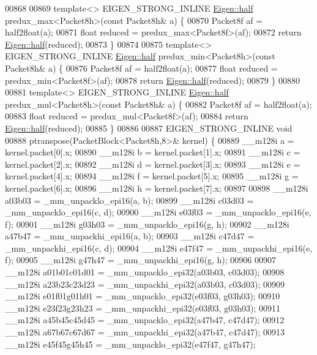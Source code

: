 \begin{DoxyCode}
00868 
00869 \textcolor{keyword}{template}<> EIGEN\_STRONG\_INLINE \hyperlink{struct_eigen_1_1half}{Eigen::half} predux\_max<Packet8h>(\textcolor{keyword}{const} Packet8h& a) \{
00870   Packet8f af = half2float(a);
00871   \textcolor{keywordtype}{float} reduced = predux\_max<Packet8f>(af);
00872   \textcolor{keywordflow}{return} \hyperlink{struct_eigen_1_1half}{Eigen::half}(reduced);
00873 \}
00874 
00875 \textcolor{keyword}{template}<> EIGEN\_STRONG\_INLINE \hyperlink{struct_eigen_1_1half}{Eigen::half} predux\_min<Packet8h>(\textcolor{keyword}{const} Packet8h& a) \{
00876   Packet8f af = half2float(a);
00877   \textcolor{keywordtype}{float} reduced = predux\_min<Packet8f>(af);
00878   \textcolor{keywordflow}{return} \hyperlink{struct_eigen_1_1half}{Eigen::half}(reduced);
00879 \}
00880 
00881 \textcolor{keyword}{template}<> EIGEN\_STRONG\_INLINE \hyperlink{struct_eigen_1_1half}{Eigen::half} predux\_mul<Packet8h>(\textcolor{keyword}{const} Packet8h& a) \{
00882   Packet8f af = half2float(a);
00883   \textcolor{keywordtype}{float} reduced = predux\_mul<Packet8f>(af);
00884   \textcolor{keywordflow}{return} \hyperlink{struct_eigen_1_1half}{Eigen::half}(reduced);
00885 \}
00886 
00887 EIGEN\_STRONG\_INLINE \textcolor{keywordtype}{void}
00888 ptranspose(PacketBlock<Packet8h,8>& kernel) \{
00889   \_\_m128i a = kernel.packet[0].x;
00890   \_\_m128i b = kernel.packet[1].x;
00891   \_\_m128i c = kernel.packet[2].x;
00892   \_\_m128i d = kernel.packet[3].x;
00893   \_\_m128i e = kernel.packet[4].x;
00894   \_\_m128i f = kernel.packet[5].x;
00895   \_\_m128i g = kernel.packet[6].x;
00896   \_\_m128i h = kernel.packet[7].x;
00897 
00898   \_\_m128i a03b03 = \_mm\_unpacklo\_epi16(a, b);
00899   \_\_m128i c03d03 = \_mm\_unpacklo\_epi16(c, d);
00900   \_\_m128i e03f03 = \_mm\_unpacklo\_epi16(e, f);
00901   \_\_m128i g03h03 = \_mm\_unpacklo\_epi16(g, h);
00902   \_\_m128i a47b47 = \_mm\_unpackhi\_epi16(a, b);
00903   \_\_m128i c47d47 = \_mm\_unpackhi\_epi16(c, d);
00904   \_\_m128i e47f47 = \_mm\_unpackhi\_epi16(e, f);
00905   \_\_m128i g47h47 = \_mm\_unpackhi\_epi16(g, h);
00906 
00907   \_\_m128i a01b01c01d01 = \_mm\_unpacklo\_epi32(a03b03, c03d03);
00908   \_\_m128i a23b23c23d23 = \_mm\_unpackhi\_epi32(a03b03, c03d03);
00909   \_\_m128i e01f01g01h01 = \_mm\_unpacklo\_epi32(e03f03, g03h03);
00910   \_\_m128i e23f23g23h23 = \_mm\_unpackhi\_epi32(e03f03, g03h03);
00911   \_\_m128i a45b45c45d45 = \_mm\_unpacklo\_epi32(a47b47, c47d47);
00912   \_\_m128i a67b67c67d67 = \_mm\_unpackhi\_epi32(a47b47, c47d47);
00913   \_\_m128i e45f45g45h45 = \_mm\_unpacklo\_epi32(e47f47, g47h47);

\end{DoxyCode}
